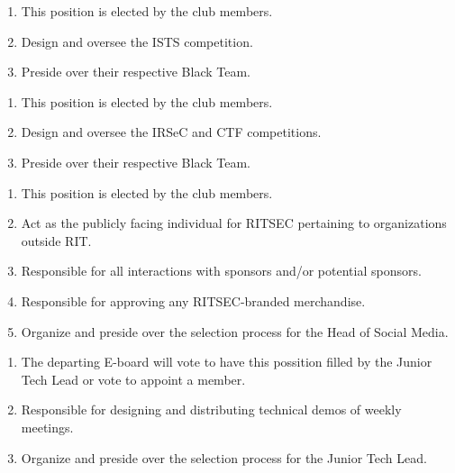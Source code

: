 
\begin{enumerate}
	\item This position is elected by the club members.
	\item Design and oversee the ISTS competition.
	\item Preside over their respective Black Team.
\end{enumerate}


\begin{enumerate}
	\item This position is elected by the club members.
	\item Design and oversee the IRSeC and CTF competitions.
	\item Preside over their respective Black Team.
\end{enumerate}


\begin{enumerate}
	\item This position is elected by the club members.
	\item Act as the publicly facing individual for RITSEC pertaining to organizations
	      outside RIT.
	\item Responsible for all interactions with sponsors and/or potential sponsors.
	\item Responsible for approving any RITSEC-branded merchandise.
	\item Organize and preside over the selection process for the Head of Social Media.
\end{enumerate}


\begin{enumerate}
	\item The departing E-board will vote to have this possition filled by the Junior Tech Lead or vote to appoint a member.
	\item Responsible for designing and distributing technical demos of weekly meetings.
	\item Organize and preside over the selection process for the Junior Tech Lead.
\end{enumerate}


